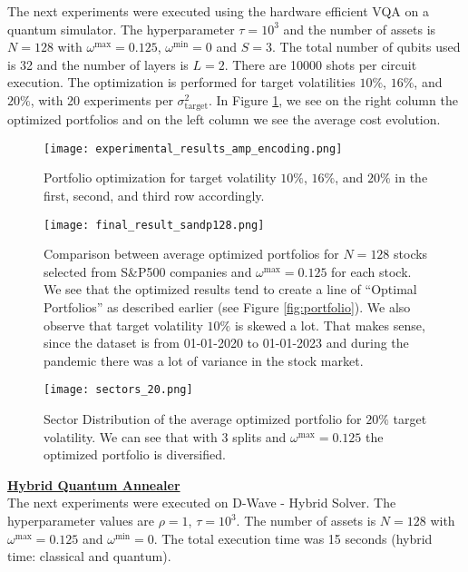 \documentclass[12pt,a4paper]{report}
\begin{document}
\noindent
The next experiments were executed using the hardware efficient VQA on a quantum simulator. The hyperparameter \(\tau=10^3\) and the number of assets is \(N=128\) with \(\omega^{\text{max}}=0.125\), \(\omega^{\text{min}}=0\) and \(S=3\). The total number of qubits used is 32 and the number of layers is \(L=2\). There are 10000 shots per circuit execution. The optimization is performed for target volatilities \(10\%\), \(16\%\), and \(20\%\), with 20 experiments per \(\sigma_{\text{target}}^2\). In Figure \ref{fig:meas_results}, we see on the right column the optimized portfolios and on the left column we see the average cost evolution.


\begin{figure}[!h]
    \centering
    \texttt{[image: experimental\_results\_amp\_encoding.png]}
    \caption{Portfolio optimization for target volatility $10\%$, $16\%$, and $20\%$ in the first, second, and third row accordingly.}
    \label{fig:meas_results}
\end{figure}

\newpage

\begin{figure}[!h]
    \centering
    \texttt{[image: final\_result\_sandp128.png]}
    \caption{Comparison between average optimized portfolios for $N=128$ stocks selected from S\&P500 companies and $\omega^{\text{max}} = 0.125$ for each stock. We see that the optimized results tend to create a line of ``Optimal Portfolios'' as described earlier (see Figure \ref{fig:portfolio}). We also observe that target volatility $10\%$ is skewed a lot. That makes sense, since the dataset is from 01-01-2020 to 01-01-2023 and during the pandemic there was a lot of variance in the stock market.}
    \label{fig:concl_results}
\end{figure}

\begin{figure}[!h]
    \centering
    \texttt{[image: sectors\_20.png]}
    \caption{Sector Distribution of the average optimized portfolio for $20\%$ target volatility. We can see that with $3$ splits and $\omega^{\text{max}} = 0.125$ the optimized portfolio is diversified.}
    \label{fig:sec_20}
\end{figure}

\newpage

\noindent
\textbf{\underline{Hybrid Quantum Annealer}}
\\

\noindent
The next experiments were executed on D-Wave - Hybrid Solver. The hyperparameter values are $\rho=1$, $\tau=10^3$. The number of assets is $N=128$ with $\omega^{\text{max}}=0.125$ and $\omega^{\text{min}}=0$. The total execution time was 15 seconds (hybrid time: classical and quantum).
\end{document}
